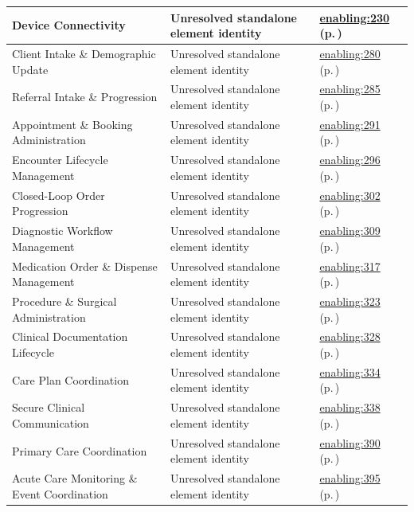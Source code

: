 \begin{longtable}{|>{\raggedright\arraybackslash}p{0.38\TableWidth}|>{\raggedright\arraybackslash}p{0.27\TableWidth}|>{\raggedright\arraybackslash}p{0.35\TableWidth}|}
Device Connectivity & Unresolved standalone element identity & \hyperref[rad:enabling:218]{enabling:230} (p.\,\pageref{rad:enabling:218})\\\hline
Client Intake \& Demographic Update & Unresolved standalone element identity & \hyperref[rad:enabling:280]{enabling:280} (p.\,\pageref{rad:enabling:280})\\\hline
Referral Intake \& Progression & Unresolved standalone element identity & \hyperref[rad:enabling:285]{enabling:285} (p.\,\pageref{rad:enabling:285})\\\hline
Appointment \& Booking Administration & Unresolved standalone element identity & \hyperref[rad:enabling:291]{enabling:291} (p.\,\pageref{rad:enabling:291})\\\hline
Encounter Lifecycle Management & Unresolved standalone element identity & \hyperref[rad:enabling:296]{enabling:296} (p.\,\pageref{rad:enabling:296})\\\hline
Closed-Loop Order Progression & Unresolved standalone element identity & \hyperref[rad:enabling:302]{enabling:302} (p.\,\pageref{rad:enabling:302})\\\hline
Diagnostic Workflow Management & Unresolved standalone element identity & \hyperref[rad:enabling:309]{enabling:309} (p.\,\pageref{rad:enabling:309})\\\hline
Medication Order \& Dispense Management & Unresolved standalone element identity & \hyperref[rad:enabling:317]{enabling:317} (p.\,\pageref{rad:enabling:317})\\\hline
Procedure \& Surgical Administration & Unresolved standalone element identity & \hyperref[rad:enabling:323]{enabling:323} (p.\,\pageref{rad:enabling:323})\\\hline
Clinical Documentation Lifecycle & Unresolved standalone element identity & \hyperref[rad:enabling:328]{enabling:328} (p.\,\pageref{rad:enabling:328})\\\hline
Care Plan Coordination & Unresolved standalone element identity & \hyperref[rad:enabling:334]{enabling:334} (p.\,\pageref{rad:enabling:334})\\\hline
Secure Clinical Communication & Unresolved standalone element identity & \hyperref[rad:enabling:338]{enabling:338} (p.\,\pageref{rad:enabling:338})\\\hline
Primary Care Coordination & Unresolved standalone element identity & \hyperref[rad:enabling:390]{enabling:390} (p.\,\pageref{rad:enabling:390})\\\hline
Acute Care Monitoring \& Event Coordination & Unresolved standalone element identity & \hyperref[rad:enabling:395]{enabling:395} (p.\,\pageref{rad:enabling:395})\\\hline

\end{longtable}
